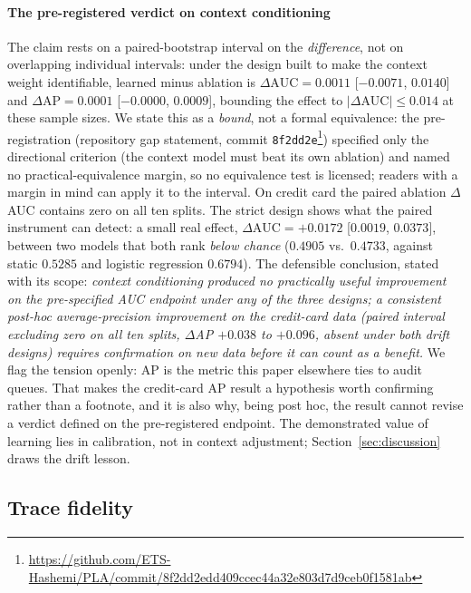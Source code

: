 \paragraph{The pre-registered verdict on context conditioning} The
claim rests on a paired-bootstrap interval on the \emph{difference},
not on overlapping individual intervals: under the design built to
make the context weight identifiable, learned minus ablation is
$\Delta\text{AUC} = 0.0011$ [$-0.0071$, $0.0140$] and
$\Delta\text{AP} = 0.0001$ [$-0.0000$, $0.0009$], bounding the effect
to $|\Delta\text{AUC}| \le 0.014$ at these sample sizes. We state this
as a \emph{bound}, not a formal equivalence: the pre-registration
(repository gap statement, commit
\texttt{8f2dd2e}\footnote{\url{https://github.com/ETS-Hashemi/PLA/commit/8f2dd2edd409ccec44a32e803d7d9ceb0f1581ab}})
specified only the
directional criterion (the context model must beat its own ablation)
and named no practical-equivalence margin, so no equivalence test
is licensed; readers with a margin in mind can apply it to the
interval. On credit card the paired ablation $\Delta$AUC contains zero
on all ten splits. The strict design shows what the paired instrument
can detect: a small real effect,
$\Delta\text{AUC} = +0.0172$ [$0.0019$, $0.0373$], between two
models that both rank \emph{below chance} ($0.4905$ vs.\ $0.4733$,
against static $0.5285$ and logistic regression $0.6794$). The
defensible conclusion, stated with its scope: \emph{context
conditioning produced no practically useful improvement on the
pre-specified AUC endpoint under any of the three designs; a
consistent post-hoc average-precision improvement on the credit-card
data (paired interval excluding zero on all ten splits,
$\Delta$AP $+0.038$ to $+0.096$, absent under both drift designs)
requires confirmation on new data before it can count as a
benefit.} We flag the tension openly: AP is the metric this paper
elsewhere ties to audit queues. That makes the credit-card
AP result a hypothesis worth confirming rather than a footnote, and
it is also why, being post hoc, the result cannot revise a verdict
defined on
the pre-registered endpoint. The demonstrated value of learning lies
in calibration, not in context adjustment;
Section~\ref{sec:discussion} draws the drift lesson.

\subsection{Trace fidelity}

